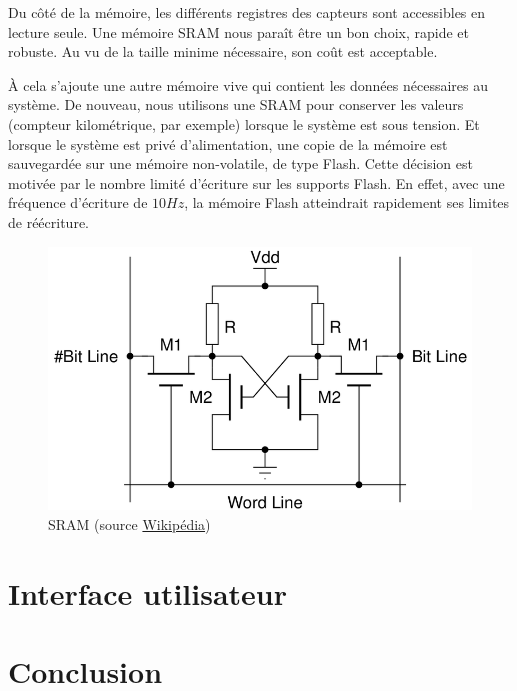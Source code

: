 \documentclass[a4paper]{article} %
\begin{document}
Du côté de la mémoire, les différents registres des capteurs sont accessibles en lecture seule.
Une mémoire SRAM nous paraît être un bon choix, rapide et robuste.
Au vu de la taille minime nécessaire, son coût est acceptable.

À cela s'ajoute une autre mémoire vive qui contient les données nécessaires au système.
De nouveau, nous utilisons une SRAM pour conserver les valeurs (compteur kilométrique, par exemple) lorsque le système est sous tension.
Et lorsque le système est privé d'alimentation, une copie de la mémoire est sauvegardée sur une mémoire non-volatile, de type Flash.
Cette décision est motivée par le nombre limité d'écriture sur les supports Flash.
En effet, avec une fréquence d'écriture de $10 H\!z$, la mémoire Flash atteindrait rapidement ses limites de réécriture.

\begin{figure}[h!]
	\centering
	\includegraphics[scale=0.4]{4T_SRAM_Cell.png}
	\caption{SRAM (source \href{http://en.wikipedia.org/wiki/Static_random-access_memory}{Wikipédia})}
\end{figure}






\section{Interface utilisateur}




\section{Conclusion}

\end{document}
